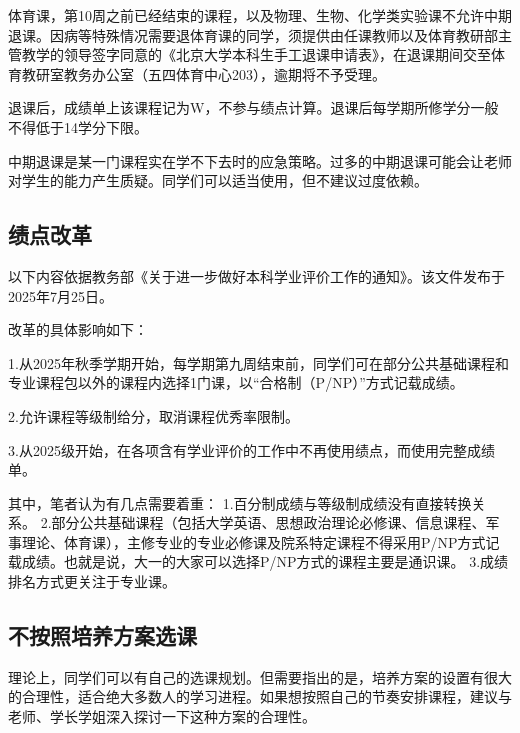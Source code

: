 \documentclass[11pt,oneside]{book}
\begin{document}
体育课，第10周之前已经结束的课程，以及物理、生物、化学类实验课不允许中期退课。因病等特殊情况需要退体育课的同学，须提供由任课教师以及体育教研部主管教学的领导签字同意的《北京大学本科生手工退课申请表》，在退课期间交至体育教研室教务办公室（五四体育中心203），逾期将不予受理。

\vspace{10pt}

退课后，成绩单上该课程记为W，不参与绩点计算。退课后每学期所修学分一般不得低于14学分下限。

\vspace{10pt}

中期退课是某一门课程实在学不下去时的应急策略。过多的中期退课可能会让老师对学生的能力产生质疑。同学们可以适当使用，但不建议过度依赖。

\subsection{绩点改革}
以下内容依据教务部《关于进一步做好本科学业评价工作的通知》。该文件发布于2025年7月25日。

\vspace{10pt}

改革的具体影响如下：

\vspace{10pt}

1.从2025年秋季学期开始，每学期第九周结束前，同学们可在部分公共基础课程和专业课程包以外的课程内选择1门课，以“合格制（P/NP）”方式记载成绩。

\vspace{10pt}

2.允许课程等级制给分，取消课程优秀率限制。

\vspace{10pt}

3.从2025级开始，在各项含有学业评价的工作中不再使用绩点，而使用完整成绩单。

\vspace{10pt}

其中，笔者认为有几点需要着重：
1.百分制成绩与等级制成绩没有直接转换关系。
2.部分公共基础课程（包括大学英语、思想政治理论必修课、信息课程、军事理论、体育课），主修专业的专业必修课及院系特定课程不得采用P/NP方式记载成绩。也就是说，大一的大家可以选择P/NP方式的课程主要是通识课。
3.成绩排名方式更关注于专业课。

\subsection{不按照培养方案选课}
理论上，同学们可以有自己的选课规划。但需要指出的是，培养方案的设置有很大的合理性，适合绝大多数人的学习进程。如果想按照自己的节奏安排课程，建议与老师、学长学姐深入探讨一下这种方案的合理性。
\end{document}
